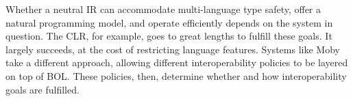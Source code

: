Whether a neutral IR can accommodate multi-language type safety, offer a natural programming model, and operate efficiently depends on the system in question. The CLR, for example, goes to great lengths to fulfill these goals. It largely succeeds, at the cost of restricting language features. Systems like Moby take a different approach, allowing different interoperability policies to be layered on top of BOL. These policies, then, determine whether and how interoperability goals are fulfilled.
